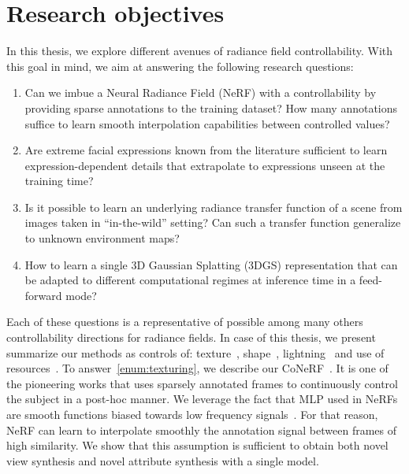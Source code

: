 \section{Research objectives}
  In this thesis, we explore different avenues of radiance field
  controllability.
  With this goal in mind, we aim at answering the following research questions:
  \begin{enumerate}[label=(\textbf{RQ \arabic*})]
    \item \label{enum:texturing}
          Can we imbue a Neural Radiance Field (NeRF) with a controllability
          by providing sparse annotations to the training dataset?
          How many annotations suffice to learn smooth interpolation
          capabilities between controlled values?

    \item \label{enum:movement}
          Are extreme facial expressions known from the literature sufficient
          to learn expression-dependent details that extrapolate to
          expressions unseen at the training time?

    \item \label{enum:lighting}
          Is it possible to learn an underlying radiance transfer function of
          a scene from images taken in ``in-the-wild'' setting?
          Can such a transfer function generalize to unknown environment maps?

    \item \label{enum:resources}
          How to learn a single 3D Gaussian Splatting (3DGS) representation
          that can be adapted to different computational regimes at inference
          time in a feed-forward mode?
  \end{enumerate}

  Each of these questions is a representative of possible among many others
  controllability directions for radiance fields.
  In case of this thesis, we present summarize our methods as controls of:
  texture~\cite{kania2022conerf,kania2023blendfields},
  shape~\cite{kania2023blendfields}, lightning~\cite{kaleta2024lumigauss} and
  use of resources~\cite{kania2024clog}.
  To answer~\ref{enum:texturing}, we describe our
  CoNeRF~\cite{kania2022conerf}.
  It is one of the pioneering works that uses sparsely annotated frames to
  continuously control the subject in a post-hoc manner.
  We leverage the fact that MLP used in NeRFs are smooth functions biased
  towards low frequency signals~\cite{tancik2020fourier}.
  For that reason, NeRF can learn to interpolate smoothly the annotation
  signal between frames of high similarity.
  We show that this assumption is sufficient to obtain both novel view
  synthesis and novel attribute synthesis with a single model.


